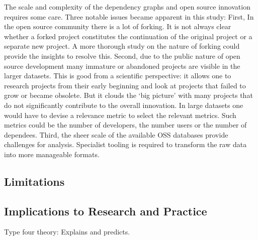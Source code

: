 \documentclass[smallextended,final]{svjour3}
\begin{document}
The scale and complexity of the dependency graphs and open source innovation requires some care. Three notable issues became apparent in this study: First, In the open source community there is a lot of forking. It is not always clear whether a forked project constitutes the continuation of the original project or a separate new project. A more thorough study on the nature of forking could provide the insights to resolve this. Second, due to the public nature of open source development many immature or abandoned projects are visible in the larger datasets. This is good from a scientific perspective: it allows one to research projects from their early beginning and look at projects that failed to grow or became obsolete. But it clouds the `big picture' with many projects that do not significantly contribute to the overall innovation. In large datasets one would have to devise a relevance metric to select the relevant metrics. Such metrics could be the number of developers, the number users or the number of dependees. Third, the sheer scale of the available OSS databases provide challenges for analysis. Specialist tooling is required to transform the raw data into more manageable formats.

\subsection{Limitations}

\subsection{Implications to Research and Practice}

Type four theory: Explains and predicts.



\end{document}
